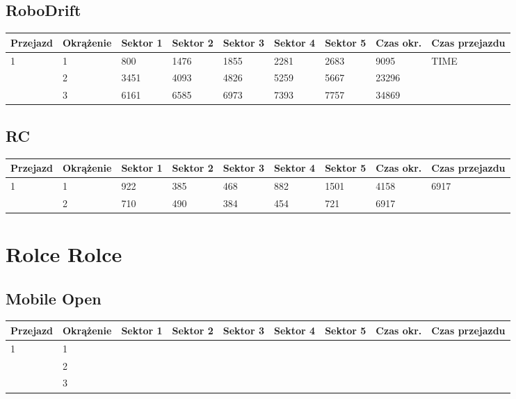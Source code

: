 \documentclass[11pt]{article}
\begin{document}
\subsection{RoboDrift}
\begin{table}[h]
\begin{tabular}{|l|l|l|l|l|l|l|l|l|}
\hline
   Przejazd        & Okrążenie & Sektor 1 & Sektor 2 & Sektor 3 & Sektor 4 & Sektor 5 & Czas okr. & Czas przejazdu    \\ \hline
\multirow{3}{*}{1}& 1 &800& 1476& 1855& 2281& 2683& 9095& \multirow{3}{*}{TIME} \\ \cline{2-8}
& 2& 3451& 4093& 4826& 5259& 5667& 23296& \\ \cline{2-8}
& 3& 6161& 6585& 6973& 7393& 7757& 34869& \\ \hline
\end{tabular}
\end{table}
\subsection{RC}
\begin{table}[h]
\begin{tabular}{|l|l|l|l|l|l|l|l|l|}
\hline
 Przejazd        & Okrążenie & Sektor 1 & Sektor 2 & Sektor 3 & Sektor 4 & Sektor 5 & Czas okr. & Czas przejazdu    \\ \hline
\multirow{2}{*}{1}& 1 &922& 385& 468& 882& 1501& 4158& \multirow{2}{*}{6917} \\ \cline{2-8}
& 2& 710& 490& 384& 454& 721& 6917& \\ \hline
\end{tabular}
\end{table}
\pagebreak
\section{Rolce Rolce}
\subsection{Mobile Open}
\begin{table}[h]
\begin{tabular}{|l|l|l|l|l|l|l|l|l|}
\hline
   Przejazd        & Okrążenie & Sektor 1 & Sektor 2 & Sektor 3 & Sektor 4 & Sektor 5 & Czas okr. & Czas przejazdu    \\ \hline
\multirow{3}{*}{1} & 1         &          &          &          &          &          &           & \multirow{3}{*}{} \\ \cline{2-8}
                         & 2         &          &          &          &          &          &           &                    \\ \cline{2-8}
                         & 3         &          &          &          &          &          &           &                    \\ \hline
\end{tabular}
\end{table}
\end{document}
